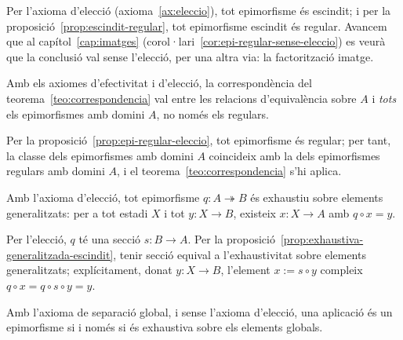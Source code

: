 \begin{prova}
Per l'axioma d'elecció (axioma~\ref{ax:eleccio}), tot epimorfisme és escindit; i per la proposició~\ref{prop:escindit-regular}, tot epimorfisme escindit és regular. Avancem que al capítol~\ref{cap:imatges} (corol·lari~\ref{cor:epi-regular-sense-eleccio}) es veurà que la conclusió val sense l'elecció, per una altra via: la factorització imatge.
\end{prova}

\begin{corollari}\label{cor:correspondencia-tots-epis}
Amb els axiomes d'efectivitat i d'elecció, la correspondència del teorema~\ref{teo:correspondencia} val entre les relacions d'equivalència sobre \(A\) i \emph{tots} els epimorfismes amb domini \(A\), no només els regulars.
\end{corollari}

\begin{prova}
Per la proposició~\ref{prop:epi-regular-eleccio}, tot epimorfisme és regular; per tant, la classe dels epimorfismes amb domini \(A\) coincideix amb la dels epimorfismes regulars amb domini \(A\), i el teorema~\ref{teo:correspondencia} s'hi aplica.
\end{prova}

\begin{proposicio}\label{prop:epi-exhaustiu-generalitzat}
Amb l'axioma d'elecció, tot epimorfisme \(q\colon A\twoheadrightarrow B\) és exhaustiu sobre elements generalitzats: per a tot estadi \(X\) i tot \(y\colon X\to B\), existeix \(x\colon X\to A\) amb \(q\circ x=y\).
\end{proposicio}

\begin{prova}
Per l'elecció, \(q\) té una secció \(s\colon B\to A\). Per la proposició~\ref{prop:exhaustiva-generalitzada-escindit}, tenir secció equival a l'exhaustivitat sobre elements generalitzats; explícitament, donat \(y\colon X\to B\), l'element \(x:=s\circ y\) compleix \(q\circ x=q\circ s\circ y=y\).
\end{prova}

\begin{proposicio}\label{prop:epi-exhaustiu-global}
Amb l'axioma de separació global, i sense l'axioma d'elecció, una aplicació és un epimorfisme si i només si és exhaustiva sobre els elements globals.
\end{proposicio}


